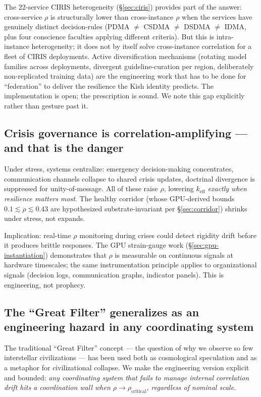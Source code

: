 \documentclass[11pt,a4paper]{article}
\begin{document}
The 22-service CIRIS heterogeneity (\S\ref{sec:ciris}) provides part of the answer: cross-service $\rho$ is structurally lower than cross-instance $\rho$ when the services have genuinely distinct decision-rules (PDMA $\neq$ CSDMA $\neq$ DSDMA $\neq$ IDMA, plus four conscience faculties applying different criteria). But this is intra-instance heterogeneity; it does not by itself solve cross-instance correlation for a fleet of CIRIS deployments. Active diversification mechanisms (rotating model families across deployments, divergent guideline-curation per region, deliberately non-replicated training data) are the engineering work that has to be done for ``federation'' to deliver the resilience the Kish identity predicts. The implementation is open; the prescription is sound. We note this gap explicitly rather than gesture past it.

\subsection{Crisis governance is correlation-amplifying --- and that is the danger}
Under stress, systems centralize: emergency decision-making concentrates, communication channels collapse to shared crisis updates, doctrinal divergence is suppressed for unity-of-message. All of these raise $\rho$, lowering $k_{\text{eff}}$ \emph{exactly when resilience matters most}. The healthy corridor (whose GPU-derived bounds $0.1 \lesssim \rho \lesssim 0.43$ are hypothesized substrate-invariant per \S\ref{sec:corridor}) shrinks under stress, not expands.

Implication: real-time $\rho$ monitoring during crises could detect rigidity drift before it produces brittle responses. The GPU strain-gauge work (\S\ref{sec:gpu-instantiation}) demonstrates that $\rho$ is measurable on continuous signals at hardware timescales; the same instrumentation principle applies to organizational signals (decision logs, communication graphs, indicator panels). This is engineering, not prophecy.

\subsection{The ``Great Filter'' generalizes as an engineering hazard in any coordinating system}
\label{sec:implications-great-filter}
The traditional ``Great Filter'' concept --- the question of why we observe so few interstellar civilizations --- has been used both as cosmological speculation and as a metaphor for civilizational collapse. We make the engineering version explicit and bounded: \emph{any coordinating system that fails to manage internal correlation drift hits a coordination wall when $\rho \to \rho_{\text{critical}}$, regardless of nominal scale.}
\end{document}
